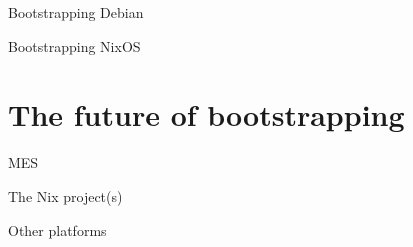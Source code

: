 \documentclass[12pt]{beamer}
\begin{document}
  \begin{frame}{Bootstrapping Debian}

  \end{frame}

  \begin{frame}{Bootstrapping NixOS}

  \end{frame}

  \section{The future of bootstrapping}

  \begin{frame}{MES}
  \end{frame}

  \begin{frame}{The Nix project(s)}
  \end{frame}

  \begin{frame}{Other platforms}

  \end{frame}
\end{document}
